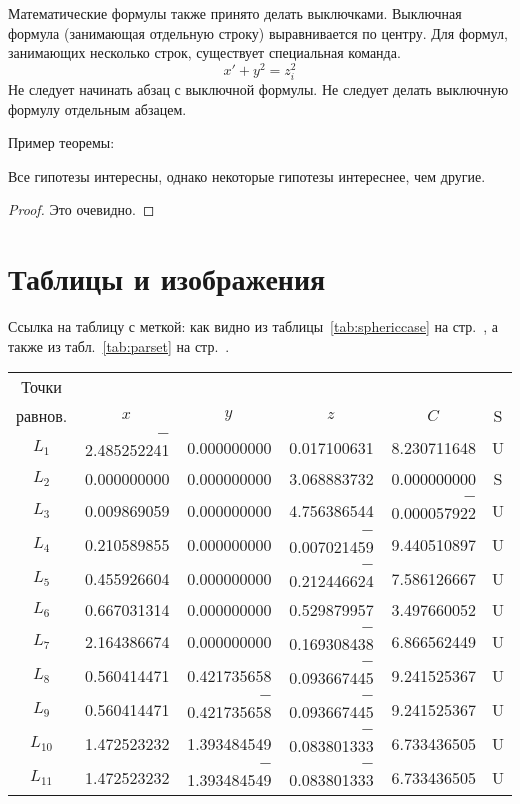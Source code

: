 \documentclass[final,pdftex]{epsilonj}
\numberwithin{equation}{section}
\begin{document}
Математические формулы также принято делать выключками. Выключная формула (занимающая отдельную строку) выравнивается по центру. Для формул, занимающих несколько строк, существует специальная команда.
   \[  x' + y^{2} = z_{i}^{2}\]
Не следует начинать абзац с выключной формулы. Не следует делать выключную формулу отдельным абзацем.

Пример теоремы:


\begin{thm}
Все гипотезы интересны, однако некоторые гипотезы интереснее, чем другие. 
\end{thm}

\begin{proof}
Это очевидно.
\end{proof}

\section{Таблицы и изображения}
Ссылка на таблицу с меткой: как видно из таблицы~\ref{tab:sphericcase} на стр.~\pageref{tab:sphericcase}, а также из табл.~\ref{tab:parset} на стр.~\pageref{tab:parset}.


\begin{table*} \centering
\begin{tabular}{crrrrc}
\toprule
Точки \\
равнов. & \multicolumn{1}{c}{$x$} & \multicolumn{1}{c}{$y$} & \multicolumn{1}{c}{$z$} & \multicolumn{1}{c}{$C$} &
S \\
\midrule
$L_1$ & $-$2.485252241 & 0.000000000 & 0.017100631 & 8.230711648 & U \\
$L_2$ &    0.000000000 & 0.000000000 & 3.068883732 & 0.000000000 & S \\
$L_3$ &    0.009869059 & 0.000000000 & 4.756386544 & $-$0.000057922 & U \\
$L_4$ &    0.210589855 & 0.000000000 & $-$0.007021459 & 9.440510897 & U \\
$L_5$ &    0.455926604 & 0.000000000 & $-$0.212446624 & 7.586126667 & U \\
$L_6$ &    0.667031314 & 0.000000000 & 0.529879957 & 3.497660052 & U \\
$L_7$ &    2.164386674 & 0.000000000 & $-$0.169308438 & 6.866562449 & U \\
$L_8$ &    0.560414471 & 0.421735658 & $-$0.093667445 & 9.241525367 & U \\
$L_9$ &    0.560414471 & $-$0.421735658 & $-$0.093667445 & 9.241525367 & U \\
$L_{10}$ & 1.472523232 & 1.393484549 & $-$0.083801333 & 6.733436505 & U \\
$L_{11}$ & 1.472523232 & $-$1.393484549 & $-$0.083801333 & 6.733436505 & U
\\ \bottomrule
\end{tabular}
\caption{Сферический случай ($I_1=0$, $I_2=0$)}
\label{tab:sphericcase}
\end{table*}
\end{document}
